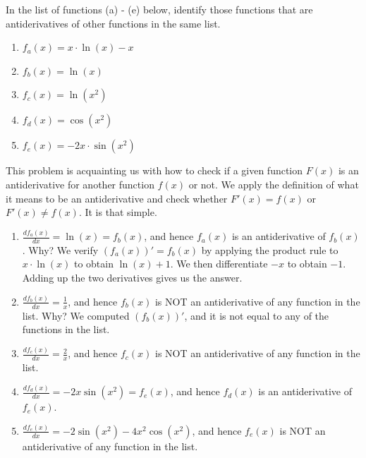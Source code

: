 \begin{example} 
\label{ex:VerifyingAntiderivatives}
In the list of functions (a) - (e) below, identify those functions that are antiderivatives of other functions in the same list.

\begin{enumerate}
\renewcommand{\labelenumi}{(\alph{enumi})}
\setlength{\itemsep}{.2cm}
    \item $f_a(x) = x \cdot \ln(x) - x$
     \item $f_b(x) =  \ln(x) $
      \item $f_c(x) = \ln(x^2)$
       \item $f_d(x) = \cos(x^2)$
        \item $f_e(x) = -2x \cdot \sin(x^2)$
\end{enumerate}
    
\end{example}

\solution This problem is acquainting us with how to check if a given function $F(x)$ is an antiderivative for another function $f(x)$ or not. We apply the definition of what it means to be an antiderivative and check whether $F'(x) = f(x)$ or $F'(x) \neq f(x)$. It is that simple.

\begin{enumerate}
\renewcommand{\labelenumi}{(\alph{enumi})}
\setlength{\itemsep}{.2cm}
    \item $\frac{df_a(x)}{dx} = \ln(x) = f_b(x)$, and hence $f_a(x)$ is an antiderivative of $f_b(x)$. Why? We verify $\left(f_a(x) \right)' = f_b(x)$ by applying the product rule to $x\cdot \ln(x)$ to obtain $\ln(x)+1$. We then differentiate $-x$ to obtain $-1$. Adding up the two derivatives gives us the answer.
     \item $\frac{df_b(x)}{dx} =  \frac{1}{x}$, and hence $f_b(x)$ is NOT an antiderivative of any function in the list. Why? We computed $\left(f_b(x) \right)'$, and it is not equal to any of the functions in the list.
      \item $\frac{df_c(x)}{dx} =  \frac{2}{x}$,  and hence $f_c(x)$ is NOT an antiderivative of any function in the list. 
       \item $\frac{df_d(x)}{dx} = - 2 x \sin\left( x^{2} \right) = f_e(x)$, and hence $f_d(x)$ is an antiderivative of $f_e(x)$.
        \item $\frac{df_e(x)}{dx} =  - 2 \sin\left( x^{2} \right) - 4 x^{2} \cos\left( x^{2} \right)$, and hence $f_e(x)$ is NOT an antiderivative of any function in the list. 
\end{enumerate}

